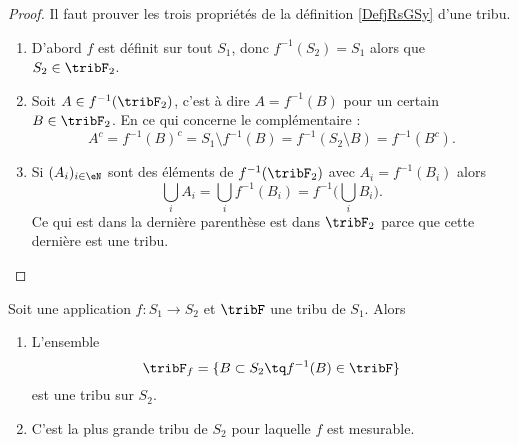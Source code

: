 \begin{proof}
    Il faut prouver les trois propriétés de la définition \ref{DefjRsGSy} d'une tribu.
    \begin{enumerate}
        \item
            D'abord \( f\) est définit sur tout \( S_1\), donc \( f^{-1}(S_2)=S_1\) alors que \( S_2\in \tribF_2\).
        \item
            Soit \( A\in f^{-1}(\tribF_2)\), c'est à dire \( A=f^{-1}(B)\) pour un certain \( B\in \tribF_2\). En ce qui concerne le complémentaire :
            \begin{equation}
                A^c=f^{-1}(B)^c=S_1\setminus f^{-1}(B)=f^{-1}(S_2\setminus B)=f^{-1}(B^c).
            \end{equation}
        \item
            Si \( (A_i)_{i\in \eN}\) sont des éléments de \( f^{-1}(\tribF_2)\) avec \( A_i=f^{-1}(B_i)\) alors
            \begin{equation}
                \bigcup_iA_i=\bigcup_if^{-1}(B_i)=f^{-1}\big( \bigcup_iB_i \big).
            \end{equation}
            Ce qui est dans la dernière parenthèse est dans \( \tribF_2\) parce que cette dernière est une tribu.
    \end{enumerate}
\end{proof}

\begin{lemma}       \label{LemJYKBooBSXBXJ}
    Soit une application \( f\colon S_1\to S_2\) et \( \tribF\) une tribu de \( S_1\). Alors
    \begin{enumerate}
        \item
            L'ensemble
            \begin{equation}
                \tribF_f=\{  B\subset S_2\tq f^{-1}(B)\in \tribF  \}
            \end{equation}
            est une tribu sur \( S_2\).
        \item
            C'est la plus grande tribu de \( S_2\) pour laquelle \( f\) est mesurable.
    \end{enumerate}
\end{lemma}


